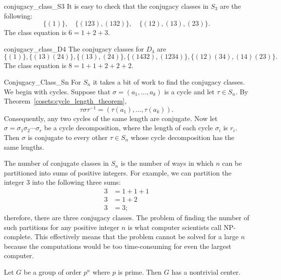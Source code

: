  
\begin{example}{conjugacy_class_S3}
It is easy to check that  the conjugacy classes in $S_3$ are the
following: 
\[
\{ (1) \},  \quad \{ (123), (132) \}, \quad \{(12), (13), (23) \}.
\]
The class equation is $6 = 1+2+3$.
\end{example}
 
 
\begin{example}{conjugacy_class_D4} %
The conjugacy classes for $D_4$ are
\[
\{ (1) \}, 
\{ (13)(24) \},
\{ (13), (24) \}, 
\{ (1432), (1234) \}, 
\{ (12)(34), (14)(23) \}.
\]
The class equation is $8 = 1 +  1 + 2 + 2 + 2$.
\end{example}
 
 
\begin{example}{Conjugacy_Class_Sn}
For $S_n$ it takes a bit of work to find the conjugacy classes.  We
begin with cycles.  Suppose that $\sigma = ( a_1, \ldots, a_k)$ is a
cycle and let $\tau \in S_n$. By Theorem~\ref{cosets:cycle_length_theorem},
\[
\tau \sigma \tau^{-1} = ( \tau( a_1), \ldots, \tau(a_k)).
\]
Consequently, any two cycles of the same length are conjugate. Now let
$\sigma = \sigma_1 \sigma_2 \cdots \sigma_r$ be a cycle decomposition,
where the length of each cycle $\sigma_i$ is $r_i$. Then $\sigma$ is
conjugate to every other $\tau \in S_n$ whose cycle decomposition has
the same lengths. 
 
 
The number of conjugate classes in $S_n$ is the number of ways in
which $n$ can be partitioned into sums of positive integers. For
example, we can partition the integer 3 into the following three sums: 
\begin{align*}
3 & =  1 + 1 + 1 \\
3 & =  1 + 2 \\
3 & =  3;
\end{align*}
therefore, there are three conjugacy classes. The problem of finding
the number of such partitions for any positive integer $n$ is what
computer scientists call {\bfi NP-complete}.  This effectively means
that the problem cannot be solved for a large $n$ because the
computations would be too time-consuming for even the largest computer. 
\end{example}
 
 

 
 
\begin{theorem}\label{pn_theorem}
Let $G$ be a group of order $p^n$ where $p$ is prime. Then $G$ has a
nontrivial center. 
\end{theorem}
 
